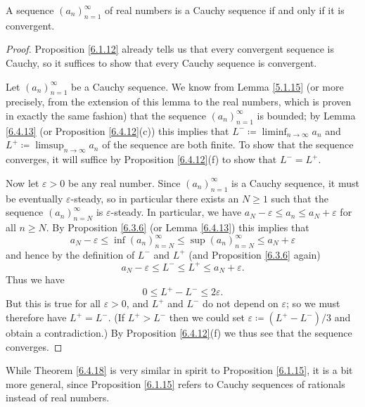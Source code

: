 \begin{theorem}\label{6.4.18}
    A sequence \((a_n)_{n = 1}^\infty\) of real numbers is a Cauchy sequence if and only if it is convergent.
\end{theorem}

\begin{proof}
    Proposition \ref{6.1.12} already tells us that every convergent sequence is Cauchy, so it suffices to show that every Cauchy sequence is convergent.

    Let \((a_n)_{n = 1}^\infty\) be a Cauchy sequence.
    We know from Lemma \ref{5.1.15} (or more precisely, from the extension of this lemma to the real numbers, which is proven in exactly the same fashion) that the sequence \((a_n)_{n = 1}^\infty\) is bounded;
    by Lemma \ref{6.4.13} (or Proposition \ref{6.4.12}(c)) this implies that \(L^- \coloneqq \liminf_{n \to \infty} a_n\) and \(L^+ \coloneqq \limsup_{n \to \infty} a_n\) of the sequence are both finite.
    To show that the sequence converges, it will suffice by Proposition \ref{6.4.12}(f) to show that \(L^- = L^+\).

    Now let \(\varepsilon > 0\) be any real number.
    Since \((a_n)_{n = 1}^\infty\) is a Cauchy sequence, it must be eventually \(\varepsilon\)-steady, so in particular there exists an \(N \geq 1\) such that the sequence \((a_n)_{n = N}^\infty\) is \(\varepsilon\)-steady.
    In particular, we have \(a_N - \varepsilon \leq a_n \leq a_N + \varepsilon\) for all \(n \geq N\).
    By Proposition \ref{6.3.6} (or Lemma \ref{6.4.13}) this implies that
    \[
        a_N - \varepsilon \leq \inf(a_n)_{n = N}^\infty \leq \sup(a_n)_{n = N}^\infty \leq a_N + \varepsilon
    \]
    and hence by the definition of \(L^-\) and \(L^+\) (and Proposition \ref{6.3.6} again)
    \[
        a_N - \varepsilon \leq L^- \leq L^+ \leq a_N + \varepsilon.
    \]
    Thus we have
    \[
        0 \leq L^+ - L^- \leq 2\varepsilon.
    \]
    But this is true for all \(\varepsilon > 0\), and \(L^+\) and \(L^-\) do not depend on \(\varepsilon\);
    so we must therefore have \(L^+ = L^-\).
    (If \(L^+ > L^-\) then we could set \(\varepsilon \coloneqq (L^+ - L^-) / 3\) and obtain a contradiction.)
    By Proposition \ref{6.4.12}(f) we thus see that the sequence converges.
\end{proof}

\begin{remark}\label{6.4.19}
    While Theorem \ref{6.4.18} is very similar in spirit to Proposition \ref{6.1.15}, it is a bit more general, since Proposition \ref{6.1.15} refers to Cauchy sequences of rationals instead of real numbers.
\end{remark}

